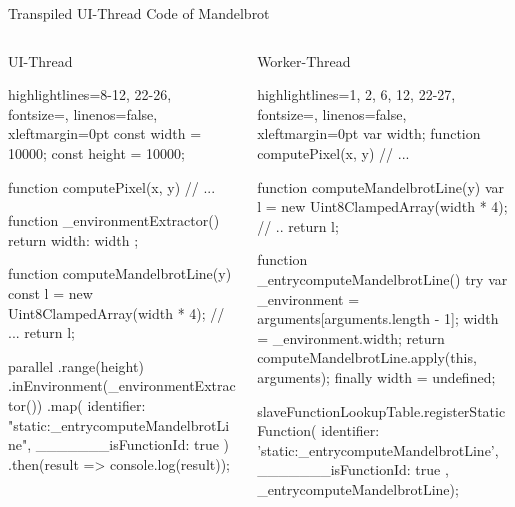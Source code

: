 \begin{frame}{Transpiled UI-Thread Code of Mandelbrot}
\begin{columns}[t]
	\begin{column}{0.5\textwidth}
		UI-Thread
		\begin{javascriptcode*}{highlightlines={8-12, 22-26}, fontsize=\fontsize{5pt}{6pt}, linenos=false, xleftmargin=0pt}
const width = 10000;
const height = 10000;

function computePixel(x, y) {
	// ...
}

function _environmentExtractor() { 
	return {
		width: width
	};
}

function computeMandelbrotLine(y) {
	const l = new Uint8ClampedArray(width * 4);
	// ...
	return l;
}

parallel
	.range(height)
	.inEnvironment(_environmentExtractor()) 
	.map({ 
		identifier: "static:_entrycomputeMandelbrotLine",
		_______isFunctionId: true
	}) 
	.then(result => console.log(result));
\end{javascriptcode*}
	\end{column}
	\begin{column}{0.5\textwidth}
	Worker-Thread
	\begin{javascriptcode*}{highlightlines={1, 2, 6, 12, 22-27}, fontsize=\fontsize{5pt}{6pt}, linenos=false, xleftmargin=0pt}
var width;
function computePixel(x, y) { 
	// ...
}

function computeMandelbrotLine(y) { 
	var l = new Uint8ClampedArray(width * 4);
	// ..
	return l;
}
 
function _entrycomputeMandelbrotLine() { 
	try {
		var _environment = arguments[arguments.length - 1];
		width = _environment.width; 
		return computeMandelbrotLine.apply(this, arguments); 
	} finally {
		width = undefined;
	}
} 

slaveFunctionLookupTable.registerStaticFunction({
		identifier: 'static:_entrycomputeMandelbrotLine',
		_______isFunctionId: true
	}, _entrycomputeMandelbrotLine);
\end{javascriptcode*}
	\end{column}
\end{columns}


\end{frame}